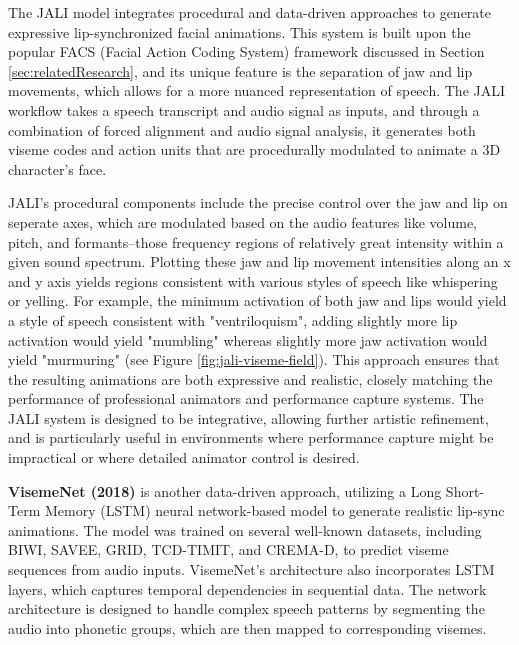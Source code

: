 \documentclass[12pt]{article}
\begin{document}
The JALI  model integrates procedural and data-driven approaches to generate expressive lip-synchronized facial animations. This system is built upon the popular FACS (Facial Action Coding System) framework \cite{Edwards2020jali-driven, Edwards2016} discussed in Section \ref{sec:relatedResearch}, and its unique feature is the separation of jaw and lip movements, which allows for a more nuanced representation of speech. The JALI workflow takes a speech transcript and audio signal as inputs, and through a combination of forced alignment and audio signal analysis, it generates both viseme codes and action units that are procedurally modulated to animate a 3D character's face.

JALI’s procedural components include the precise control over the jaw and lip on seperate axes, which are modulated based on the audio features like volume, pitch, and formants--those frequency regions of relatively great intensity within a given sound spectrum. Plotting these jaw and lip movement intensities along an x and y axis yields regions consistent with various styles of speech like whispering or yelling. For example, the minimum activation of both jaw and lips would yield a style of speech consistent with "ventriloquism", adding slightly more lip activation would yield "mumbling" whereas slightly more jaw activation would yield "murmuring" (see Figure \ref{fig:jali-viseme-field}). This approach ensures that the resulting animations are both expressive and realistic, closely matching the performance of professional animators and performance capture systems. The JALI system is designed to be integrative, allowing further artistic refinement, and is particularly useful in environments where performance capture might be impractical or where detailed animator control is desired.

\textbf{VisemeNet (2018)} \cite{Zhou2018visemenet} is another data-driven approach, utilizing a Long Short-Term Memory (LSTM) neural network-based model to generate realistic lip-sync animations. The model was trained on several well-known datasets, including BIWI, SAVEE, GRID, TCD-TIMIT, and CREMA-D, to predict viseme sequences from audio inputs. VisemeNet’s architecture also incorporates LSTM layers, which captures temporal dependencies in sequential data. The network architecture is designed to handle complex speech patterns by segmenting the audio into phonetic groups, which are then mapped to corresponding visemes. 
\end{document}
